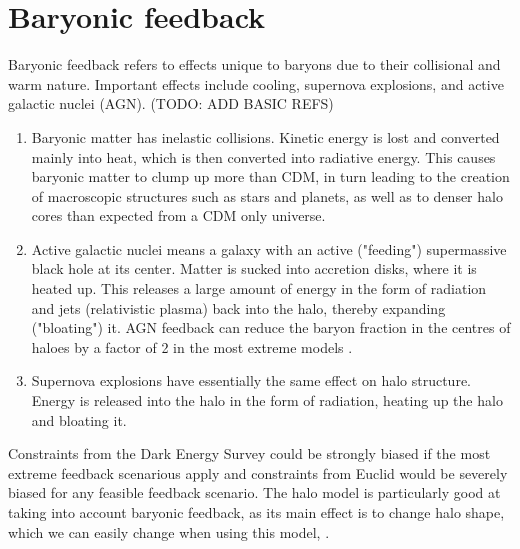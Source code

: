 \documentclass[11pt]{book}
\begin{document}
\section{Baryonic feedback}
Baryonic feedback refers to effects unique to baryons due to their collisional and warm nature. Important effects include cooling, supernova explosions, and active galactic nuclei (AGN). (TODO: ADD BASIC REFS)
\begin{enumerate}
    \item Baryonic matter has inelastic collisions. Kinetic energy is lost and converted mainly into heat, which is then converted into radiative energy. This causes baryonic matter to clump up more than CDM, in turn leading to the creation of macroscopic structures such as stars and planets, as well as to denser halo cores than expected from a CDM only universe.
    \item Active galactic nuclei means a galaxy with an active ("feeding") supermassive black hole at its center. Matter is sucked into accretion disks, where it is heated up. This releases a large amount of energy in the form of radiation and jets (relativistic plasma) back into the halo, thereby expanding ("bloating") it. AGN feedback can reduce the baryon fraction in the centres of haloes by a factor of 2 in the most extreme models \cite{Duffy_2010}.
    \item Supernova explosions have essentially the same effect on halo structure. Energy is released into the halo in the form of radiation, heating up the halo and bloating it.
\end{enumerate}
Constraints from the Dark Energy Survey could be strongly biased if the most extreme feedback scenarious apply and constraints from Euclid would be severely biased for any feasible feedback scenario. The halo model is particularly good at taking into account baryonic feedback, as its main effect is to change halo shape, which we can easily change when using this model, \cite{Duffy_2010, Semboloni_2011, mohammed2014baryoniceffectsweaklensingtwopoint}.
\end{document}
